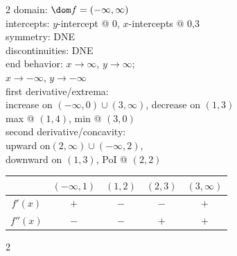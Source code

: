 \documentclass{book}
\begin{document}
\begin{appendices}
\begin{enumerate}[!HW!]
\begin{multicols}{2}
domain: $\dom f = (-\infty,\infty)$\\
intercepts: $y$-intercept @ 0, $x$-intercepts @ 0,3\\
symmetry: DNE\\ 
discontinuities: DNE\\
end behavior: $x\to\infty$, $y\to\infty$;\\ $x\to-\infty$, $y\to-\infty$\\ 
first derivative/extrema:\\ increase on $(-\infty,0)\cup (3,\infty)$, decrease on $(1,3)$\\ max @ $(1,4)$,  min @ $(3,0)$ \\
second derivative/concavity:\\ upward on$(2,\infty)\cup (-\infty,2)$,\\ downward on $(1,3)$, PoI @ $(2,2)$ \vspace{-15pt}
\begin{center}
\begin{tabular}{c|c|c|c|c}
 & $(-\infty, 1)$ & $(1, 2)$ & $(2, 3)$ & $(3,\infty)$ \\ \hline
$f'(x)$ & $+$ & $-$ & $-$ & $+$ \\ 
$f''(x)$ & $-$ & $-$ & $+$ & $+$\\ 
\end{tabular}
\end{center} 
\end{multicols}

\itemspade \mbox{}\vspace{-25pt}

\begin{multicols}{2}
\columnbreak


\end{multicols}
\end{enumerate}
\end{appendices}
\end{document}
